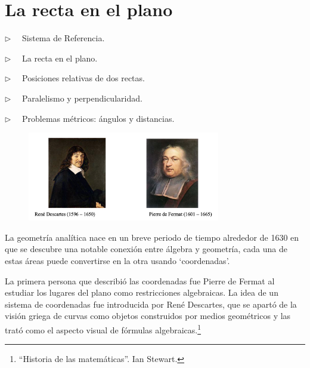 \chapter{La recta en el plano}
\label{recta}



\vspace{15mm}


\begin{adjustwidth}{40pt}{40pt}
\begin{cuadro-gris}

	\begin{multicols}{2}
	$\triangleright \quad$  Sistema de Referencia.
	
	$\triangleright \quad$  La recta en el plano.
	
	$\triangleright \quad$  Posiciones relativas de dos rectas.
	
	$\triangleright \quad$  Paralelismo y perpendicularidad.
	
	$\triangleright \quad$  Problemas métricos: ángulos y distancias.
	
	\end{multicols}
	
\end{cuadro-gris}
\end{adjustwidth}


\begin{figure}[H]
	\centering
	\includegraphics[width=0.75\textwidth]{img-ga/ga02.png}
\end{figure}

La geometría analítica nace en un breve periodo de tiempo alrededor de 1630 en que se descubre una notable conexión entre álgebra y geometría, cada una de estas áreas puede convertirse en la otra usando `coordenadas'.


La primera persona que describió las coordenadas fue Pierre de Fermat al estudiar los lugares del plano como restricciones algebraicas. La idea de un sistema de coordenadas fue introducida por René Descartes, que se apartó de la visión griega de curvas como objetos construidos por medios geométricos y las trató como el aspecto visual de fórmulas algebraicas.\footnote{ ``Historia de las matemáticas''. Ian Stewart.}



